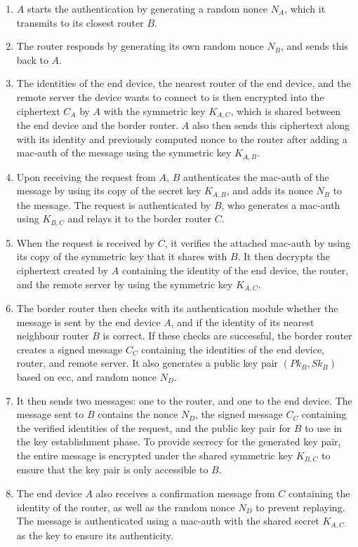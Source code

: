 \begin{enumerate}

\item $A$ starts the authentication by generating a random nonce $N_A$, which it transmits to its closest router $B$.

\item The router responds by generating its own random nonce $N_B$, and sends this back to $A$.

\item The identities of the end device, the nearest router of the end device, and the remote server the device wants to connect to is then encrypted into the ciphertext $C_A$ by $A$ with the symmetric key $K_{A,C}$, which is shared between the end device and the border router. $A$ also then sends this ciphertext along with its identity and previously computed nonce to the router after adding a \gls{mac-auth} of the message using the symmetric key $K_{A,B}$.

\item Upon receiving the request from $A$, $B$ authenticates the \gls{mac-auth} of the message by using its copy of the secret key $K_{A,B}$, and adds its nonce $N_B$ to the message. The request is authenticated by $B$, who generates a \gls{mac-auth} using $K_{B,C}$ and relays it to the border router $C$.

\item When the request is received by $C$, it verifies the attached \gls{mac-auth} by using its copy of the symmetric key that it shares with $B$. It then decrypts the ciphertext created by $A$ containing the identity of the end device, the router, and the remote server by using the symmetric key $K_{A,C}$.

\item The border router then checks with its authentication module whether the message is sent by the end device $A$, and if the identity of its nearest neighbour router $B$ is correct. If these checks are successful, the border router creates a signed message $C_C$ containing the identities of the end device, router, and remote server. It also generates a public key pair $(Pk_B, Sk_B)$ based on \gls{ecc}, and random nonce $N_D$.

\item It then sends two messages: one to the router, and one to the end device. The message sent to $B$ contains the nonce $N_D$, the signed message $C_C$ containing the verified identities of the request, and the public key pair for $B$ to use in the key establishment phase. To provide secrecy for the generated key pair, the entire message is encrypted under the shared symmetric key $K_{B,C}$ to ensure that the key pair is only accessible to $B$.

\item The end device $A$ also receives a confirmation message from $C$ containing the identity of the router, as well as the random nonce $N_D$ to prevent replaying. The message is authenticated using a \gls{mac-auth} with the shared secret $K_{A,C}$ as the key to ensure its authenticity.

\end{enumerate}



